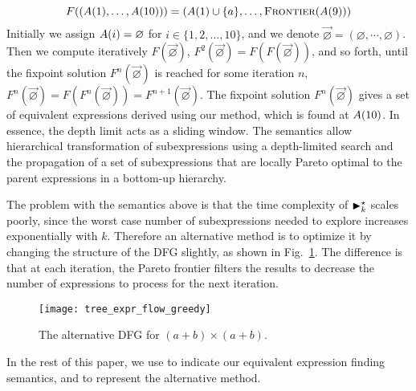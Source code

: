\begin{equation}
      F((A({1}), \ldots, A({10})))
    = (A({1}) \cup \{a\}, \ldots, \operatorname{\textsc{Frontier}}(A({9})))
    \label{eq:transfer_function}
\end{equation}
Initially we assign $A({i}) = \varnothing$ for $i\in\{1,2,\ldots,10\}$,
and we denote $\vec\varnothing = (\varnothing, \cdots, \varnothing)$.
Then we compute iteratively $F(\vec\varnothing)$, $F^2(\vec\varnothing)
= F(F(\vec\varnothing))$, and so forth, until the fixpoint
solution $F^n(\vec\varnothing)$ is reached for some iteration
$n$, \ie~$F^n(\vec\varnothing) = F(F^n(\vec\varnothing)) = F^{n +
1}(\vec\varnothing)$. The fixpoint solution $F^n(\vec\varnothing)$ gives
a set of equivalent expressions derived using our method, which is found
at $A({10})$. In essence, the depth limit acts as a sliding window.
The semantics allow hierarchical transformation of subexpressions using a
depth-limited search and the propagation of a set of subexpressions that are
locally Pareto optimal to the parent expressions in a bottom-up hierarchy.

The problem with the semantics above is that the time complexity of
$\operatorname{\blacktriangleright}^\star_k$ scales poorly, since the worst case number of subexpressions
needed to explore increases exponentially with $k$. Therefore an alternative
method is to optimize it by changing the structure of the DFG slightly, as
shown in Fig.~\ref{fig:tree_expr_flow_greedy}. The difference is that at each
iteration, the Pareto frontier filters the results to decrease the number of
expressions to process for the next iteration.
\begin{figure}[ht]
    \centering
    \texttt{[image: tree\_expr\_flow\_greedy]}
    \caption{The alternative DFG for $(a + b) \times (a + b)$.
    }\label{fig:tree_expr_flow_greedy}
\end{figure}

In the rest of this paper, we use \frontiertrace{} to indicate our equivalent
expression finding semantics, and \greedytrace{} to represent the alternative
method.
